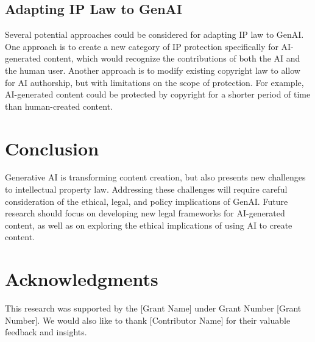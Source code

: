 \documentclass[12pt,a4paper]{article}
\begin{document}
\subsection{Adapting IP Law to GenAI}
Several potential approaches could be considered for adapting IP law to GenAI. One approach is to create a new category of IP protection specifically for AI-generated content, which would recognize the contributions of both the AI and the human user. Another approach is to modify existing copyright law to allow for AI authorship, but with limitations on the scope of protection. For example, AI-generated content could be protected by copyright for a shorter period of time than human-created content.

\section{Conclusion}
Generative AI is transforming content creation, but also presents new challenges to intellectual property law. Addressing these challenges will require careful consideration of the ethical, legal, and policy implications of GenAI. Future research should focus on developing new legal frameworks for AI-generated content, as well as on exploring the ethical implications of using AI to create content.

\section*{Acknowledgments}
This research was supported by the [Grant Name] under Grant Number [Grant Number]. We would also like to thank [Contributor Name] for their valuable feedback and insights.
\end{document}
